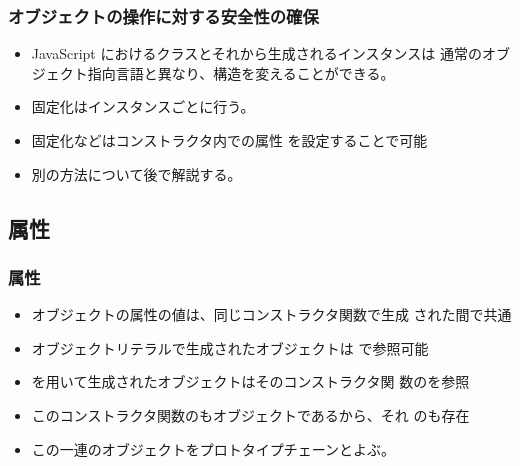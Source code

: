 \begin{frame}[containsverbatim]
 \frametitle{オブジェクトの操作に対する安全性の確保}
 \begin{itemize}
  \item JavaScript におけるクラスとそれから生成されるインスタンスは
 通常のオブジェクト指向言語と異なり、構造を変えることができる。
  \item  固定化はインスタンスごとに行う。
	\item 固定化などはコンストラクタ内での属性
				を設定することで可能
  \item 別の方法について後で解説する。
 \end{itemize}
\end{frame}
 \subsection{\protect{}属性}
 \begin{frame}[containsverbatim]
  \frametitle{\protect{}属性}
  \begin{itemize}
   \item オブジェクトの属性の値は、同じコンストラクタ関数で生成
 された間で共通
   \item オブジェクトリテラルで生成されたオブジェクトは
         で参照可能
   \item {}を用いて生成されたオブジェクトはそのコンストラクタ関
         数のを参照
   \item このコンストラクタ関数のもオブジェクトであるから、それ
 のも存在
   \item この一連のオブジェクトをプロトタイプチェーンとよぶ。
  \end{itemize}
 \end{frame}
